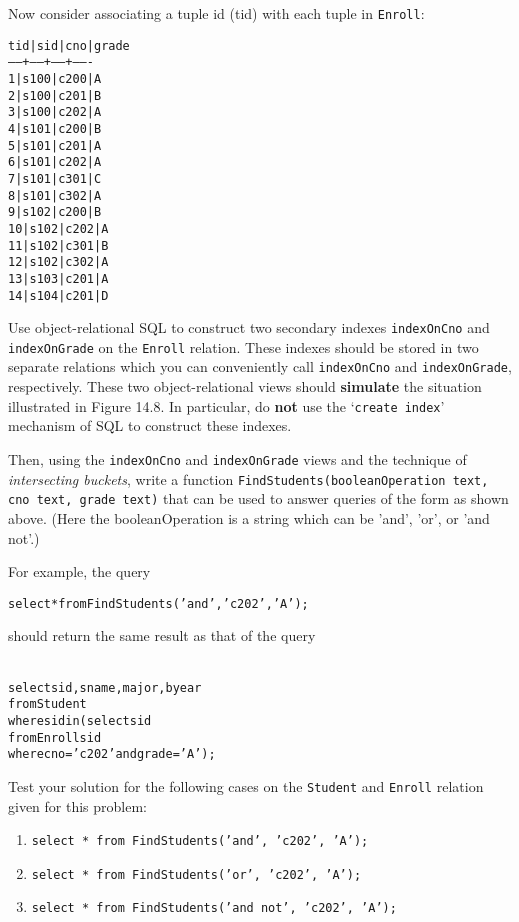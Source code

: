 \documentclass{article}
\newcommand{\blue}[1]{{\color{blue}#1}}
\begin{document}
\begin{enumerate}[resume]
Now consider associating a tuple id (tid) with each tuple in {\tt Enroll}:
{\footnotesize
\begin{alltt}
 tid | sid  | cno  | grade 
-----+------+------+-------
   1 | s100 | c200 | A
   2 | s100 | c201 | B
   3 | s100 | c202 | A
   4 | s101 | c200 | B
   5 | s101 | c201 | A
   6 | s101 | c202 | A
   7 | s101 | c301 | C
   8 | s101 | c302 | A
   9 | s102 | c200 | B
  10 | s102 | c202 | A
  11 | s102 | c301 | B
  12 | s102 | c302 | A
  13 | s103 | c201 | A
  14 | s104 | c201 | D
\end{alltt}
}

Use object-relational SQL to construct two secondary indexes {\tt indexOnCno} and {\tt indexOnGrade} on the {\tt Enroll} relation.  These indexes should be stored in two separate relations which you can conveniently call
{\tt indexOnCno} and {\tt indexOnGrade}, respectively.
These two object-relational views should {\bf simulate} the situation illustrated in Figure 14.8.  
In particular, do {\bf not} use the `\blue{\tt create index}' mechanism of SQL to construct these indexes.

Then, using the {\tt indexOnCno} and {\tt indexOnGrade} views and the technique of \emph{intersecting buckets}, write a function 
{\tt FindStudents(booleanOperation text, cno text, grade text)} that can be used to answer queries of the form as shown above.   (Here the booleanOperation is a string which can be 'and', 'or', or 'and not'.)

For example, the query
{\footnotesize
\begin{alltt}
\blue{select * from FindStudents('and', 'c202', 'A');}
\end{alltt}}
should return the same result as that of the query
{\footnotesize
\begin{alltt}{\blue{
select sid, sname, major, byear 
from   Student 
where  sid in (select sid
               from   Enroll sid
               where  cno = 'c202' and grade = 'A');}}
\end{alltt}  
}

Test your solution for the following cases on the {\tt Student} and {\tt Enroll} relation given for this problem:
\begin{enumerate}
\item {\tt select * from FindStudents('and', 'c202', 'A');}
\item {\tt select * from FindStudents('or', 'c202', 'A');}
\item {\tt select * from FindStudents('and not', 'c202', 'A');}
\end{enumerate}


\end{enumerate}
\end{document}
